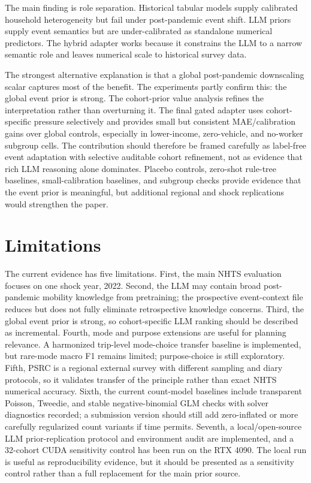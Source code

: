 \documentclass[11pt]{article}
\newcommand{\nhts}{\textsc{NHTS}}
\begin{document}
The main finding is role separation.
Historical tabular models supply calibrated household heterogeneity but fail under post-pandemic event shift.
LLM priors supply event semantics but are under-calibrated as standalone numerical predictors.
The hybrid adapter works because it constrains the LLM to a narrow semantic role and leaves numerical scale to historical survey data.

The strongest alternative explanation is that a global post-pandemic downscaling scalar captures most of the benefit.
The experiments partly confirm this: the global event prior is strong.
The cohort-prior value analysis refines the interpretation rather than overturning it.
The final gated adapter uses cohort-specific pressure selectively and provides small but consistent MAE/calibration gains over global controls, especially in lower-income, zero-vehicle, and no-worker subgroup cells.
The contribution should therefore be framed carefully as label-free event adaptation with selective auditable cohort refinement, not as evidence that rich LLM reasoning alone dominates.
Placebo controls, zero-shot rule-tree baselines, small-calibration baselines, and subgroup checks provide evidence that the event prior is meaningful, but additional regional and shock replications would strengthen the paper.

\section{Limitations}

The current evidence has five limitations.
First, the main \nhts{} evaluation focuses on one shock year, 2022.
Second, the LLM may contain broad post-pandemic mobility knowledge from pretraining; the prospective event-context file reduces but does not fully eliminate retrospective knowledge concerns.
Third, the global event prior is strong, so cohort-specific LLM ranking should be described as incremental.
Fourth, mode and purpose extensions are useful for planning relevance. A harmonized trip-level mode-choice transfer baseline is implemented, but rare-mode macro F1 remains limited; purpose-choice is still exploratory.
Fifth, PSRC is a regional external survey with different sampling and diary protocols, so it validates transfer of the principle rather than exact \nhts{} numerical accuracy.
Sixth, the current count-model baselines include transparent Poisson, Tweedie, and stable negative-binomial GLM checks with solver diagnostics recorded; a submission version should still add zero-inflated or more carefully regularized count variants if time permits.
Seventh, a local/open-source LLM prior-replication protocol and environment audit are implemented, and a 32-cohort CUDA sensitivity control has been run on the RTX 4090. The local run is useful as reproducibility evidence, but it should be presented as a sensitivity control rather than a full replacement for the main prior source.
\end{document}
